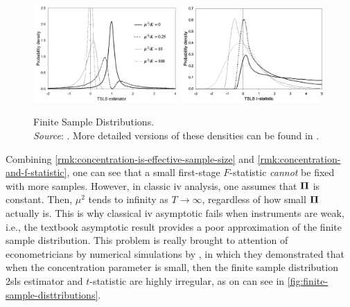\documentclass[a4paper]{article}
\begin{document}
\begin{remark}
	\begin{figure}[t]
		\centering
		\includegraphics[width=0.49\textwidth]{figures/2sls-beta.png}
		\includegraphics[width=0.49\textwidth]{figures/2sls-t-stat.png}
		\caption{Finite Sample Distributions.\vspace{3pt}\\%
		\footnotesize\emph{Source}: \textcite{stock-wright-yogo-2002}.
		More detailed versions of these densities can be found in
		\textcite{nelson-startz-1990-ecta,nelson-startz-1990-job}.}
		\label{fig:finite-sample-disttributions}
	\end{figure}
	Combining \autoref{rmk:concentration-is-effective-sample-size} and \autoref{rmk:concentration-and-f-statistic},
	one can see that a small first-stage $F$-statistic \emph{cannot} be fixed with more samples.
	However, in classic \gls*{iv} analysis, one assumes that $\boldsymbol{\Pi}$ is constant.
	Then, $\mu^2$ tends to infinity as $T\to\infty$, regardless of how small $\boldsymbol{\Pi}$ actually is.
	This is why classical \gls*{iv} asymptotic fails when instruments are weak,
	i.e., the textbook asymptotic result provides a poor approximation of the finite sample distribution.
	This problem is really brought to attention of econometricians by numerical simulations
	by \textcite{nelson-startz-1990-ecta,nelson-startz-1990-job},
	in which they demonstrated that when the concentration parameter is small,
	then the finite sample distribution \gls*{2sls} estimator and $t$-statistic are highly irregular,
	as on can see in \autoref{fig:finite-sample-disttributions}.
\end{remark}
\end{document}
